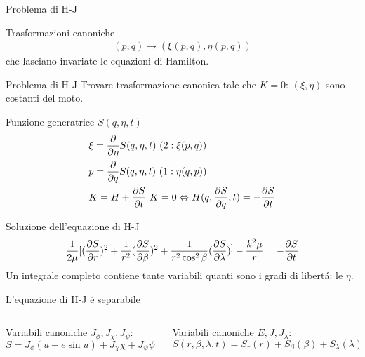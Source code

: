 \begin{frame}{Problema di H-J}
\begin{block}{Trasformazioni canoniche}
\begin{align*}
(p,q)\to(\xi(p,q),\eta(p,q))
\end{align*}
che lasciano invariate le equazioni di Hamilton.
\end{block}
\begin{block}{Problema di H-J}
Trovare trasformazione canonica tale che $K=0$: $(\xi,\eta)$ sono costanti del moto.
\end{block}
\begin{block}{Funzione generatrice $S(q,\eta,t)$}
\begin{align*}
&\xi=\PDof{\eta}S(q,\eta,t)\ (2: \xi(p,q))\\
&p=\PDof{q}S(q,\eta,t)\ (1:\eta(q,p))\\
&K=H+\PDy{t}{S}\ K=0\Leftrightarrow H(q,\PDy{q}{S},t)=-\PDy{t}{S}
\end{align*}
\end{block}
\end{frame}

\begin{frame}{Soluzione dell'equazione di H-J}
\begin{align*}
\frac{1}{2\mu}[(\PDy{r}{S})^2+\frac{1}{r^2}(\PDy{\beta}{S})^2+\frac{1}{r^2\cos^2{\beta}}(\PDy{\lambda}{S})^]-\frac{k^2\mu}{r}=-\PDy{t}{S}
\end{align*}
Un integrale completo contiene tante variabili quanti sono i gradi di libert\'a: le $\eta$.
\begin{block}{L'equazione di H-J \'e separabile}
\begin{columns}
\begin{column}{0.5\textwidth}
Variabili canoniche $J_{\phi}, J_{\chi}, J_{\psi}$:
\begin{equation*}
S=J_{\phi}(u+e\sin{u})+J_{\chi}\chi+J_{\psi}\psi-Et
\end{equation*}
\end{column}
\begin{column}{0.5\textwidth}
Variabili canoniche $E, J, J_{\lambda}$:
\begin{equation*}
S(r,\beta,\lambda,t)=S_r(r)+S_{\beta}(\beta)+S_{\lambda}(\lambda)-\sigma t
\end{equation*}
\end{column}
\end{columns}
\end{block}
\end{frame}

